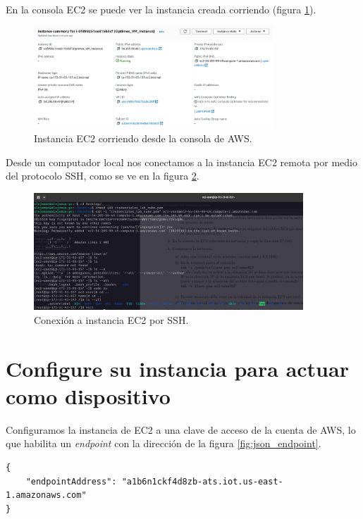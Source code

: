 \documentclass[10pt]{article}
\begin{document}
En la consola EC2 se puede ver la instancia creada corriendo (figura \ref{fig:INSTANCIA_EC2_CORRIENDO}).

\begin{figure}[H]
    \centering
    \includegraphics[width=0.8\textwidth]{Images/Running_instance_details.png}
    \caption{Instancia EC2 corriendo desde la consola de AWS.}
    \label{fig:INSTANCIA_EC2_CORRIENDO}
\end{figure}

Desde un computador local nos conectamos a la instancia EC2 remota por medio del protocolo SSH, como se ve en la figura \ref{fig:CONEXION_SSH}.

\begin{figure}[H]
    \centering
    \includegraphics[width=0.9\textwidth]{Images/Instance_ssh_terminal.png}
    \caption{Conexión a instancia EC2 por SSH.}
    \label{fig:CONEXION_SSH}
\end{figure}

\section{Configure su instancia para actuar como dispositivo}

Configuramos la instancia de EC2 a una clave de acceso de la cuenta de AWS, lo que habilita un \textit{endpoint} con la dirección de la figura \ref{fig:json_endpoint}.

\begin{lstlisting}
{
    "endpointAddress": "a1b6n1ckf4d8zb-ats.iot.us-east-1.amazonaws.com"
}
\end{lstlisting}
\end{document}
